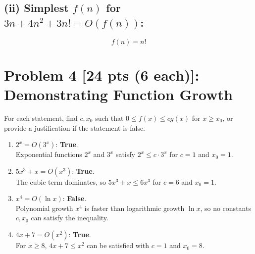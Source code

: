 \documentclass[10pt]{article}
\begin{document}
\subsection*{(ii) Simplest \( f(n) \) for \( 3n + 4n^2 + 3n! = O(f(n)) \):}
\[
f(n) = n!
\]

\newpage

\section*{Problem 4 [24 pts (6 each)]: Demonstrating Function Growth}

For each statement, find \( c, x_0 \) such that \( 0 \leq f(x) \leq c g(x) \) for \( x \geq x_0 \), or provide a justification if the statement is false.

\begin{enumerate}
    \item \( 2^x = O(3^x) \): \textbf{True}. \\
    Exponential functions \( 2^x \) and \( 3^x \) satisfy \( 2^x \leq c \cdot 3^x \) for \( c = 1 \) and \( x_0 = 1 \).

    \item \( 5x^3 + x = O(x^3) \): \textbf{True}. \\
    The cubic term dominates, so \( 5x^3 + x \leq 6x^3 \) for \( c = 6 \) and \( x_0 = 1 \).

    \item \( x^4 = O(\ln x) \): \textbf{False}. \\
    Polynomial growth \( x^4 \) is faster than logarithmic growth \( \ln x \), so no constants \( c, x_0 \) can satisfy the inequality.

    \item \( 4x + 7 = O(x^2) \): \textbf{True}. \\
    For \( x \geq 8 \), \( 4x + 7 \leq x^2 \) can be satisfied with \( c = 1 \) and \( x_0 = 8 \).
\end{enumerate}
\end{document}
